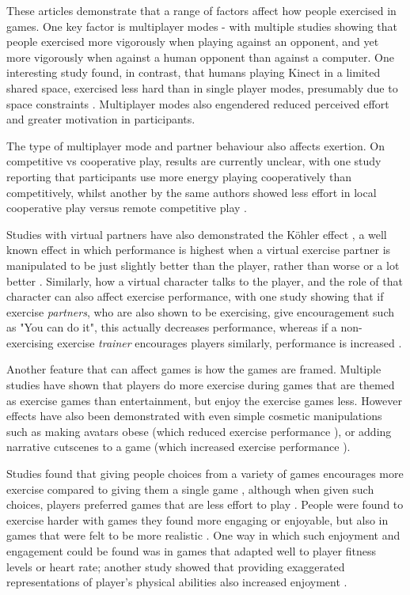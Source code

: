 These articles demonstrate that a range of factors affect how people exercised in games. One key factor is multiplayer modes - with multiple studies showing that people exercised more vigorously when playing against an opponent, and yet more vigorously when against a human opponent than against a computer. One interesting study found, in contrast, that humans playing Kinect in a limited shared space, exercised less hard than in single player modes, presumably due to space constraints \cite{Peng2013PlayingExertion}. Multiplayer modes also engendered reduced perceived effort and greater motivation in participants. 

The type of multiplayer mode and partner behaviour also affects exertion. On competitive vs cooperative play, results are currently unclear, with one study \cite{Peng2012TheGame} reporting that participants use more energy playing  cooperatively than competitively, whilst another by the same authors showed less effort in local cooperative play versus remote competitive play \cite{Peng2013PlayingExertion}. 

Studies with virtual partners have also demonstrated the Köhler effect \cite{witte1989kohler}, a well known effect in which performance is highest when a virtual exercise partner is manipulated to be just slightly better than the player, rather than worse or a lot better \cite{Feltz2012TwoPlayerActivity}. Similarly, how a virtual character talks to the player, and the role of that character can also affect exercise performance, with one study showing that if exercise \textit{partners}, who are also shown to be exercising, give encouragement such as "You can do it", this actually decreases performance, whereas if a non-exercising exercise \textit{trainer} encourages players similarly, performance is increased \cite{Max_2016}.

Another feature that can affect games is how the games are framed. Multiple studies have shown that players do more exercise during games that are themed as exercise games than entertainment, but enjoy the exercise games less. However effects have also been demonstrated with even simple cosmetic manipulations such as making avatars obese (which reduced exercise performance \cite{Pea2016IExergames,Pea2014IncreasingAppearance,Li2014WiiExergames} ), or adding narrative cutscenes to a game (which increased exercise performance \cite{Lu2016TheStudy} ).

Studies found that giving people choices from a variety of games encourages more exercise compared to giving them a single game \cite{Raynor2016EffectActivity}, although when given such choices, players preferred games that are less effort to play \cite{Bissell2016EffectivenessActivity}. People were found to exercise harder with games they found more engaging or enjoyable, but also in games that were felt to be more realistic \cite{Lyons2014EngagementPlay,Lin2015TheGames}. One way in which such enjoyment and engagement could be found was in games that adapted well to player fitness levels or heart rate; another study showed that providing exaggerated representations of player's physical abilities also increased enjoyment \cite{Kajastila2014EmpoweringGame}.

